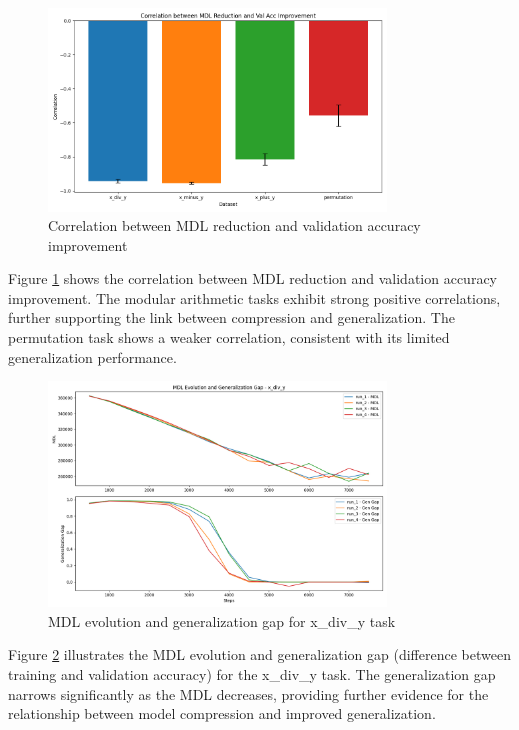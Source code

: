 \documentclass{article} %
\begin{document}
\begin{figure}[h]
\centering
\includegraphics[width=0.8\textwidth]{mdl_val_acc_correlation.png}
\caption{Correlation between MDL reduction and validation accuracy improvement}
\label{fig:mdl_val_acc_correlation}
\end{figure}

Figure \ref{fig:mdl_val_acc_correlation} shows the correlation between MDL reduction and validation accuracy improvement. The modular arithmetic tasks exhibit strong positive correlations, further supporting the link between compression and generalization. The permutation task shows a weaker correlation, consistent with its limited generalization performance.

\begin{figure}[h]
\centering
\includegraphics[width=0.8\textwidth]{mdl_gen_gap_x_div_y.png}
\caption{MDL evolution and generalization gap for x\_div\_y task}
\label{fig:mdl_gen_gap_x_div_y}
\end{figure}

Figure \ref{fig:mdl_gen_gap_x_div_y} illustrates the MDL evolution and generalization gap (difference between training and validation accuracy) for the x\_div\_y task. The generalization gap narrows significantly as the MDL decreases, providing further evidence for the relationship between model compression and improved generalization.
\end{document}

